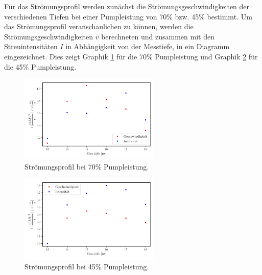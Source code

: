 Für das Strömungsprofil werden zunächst die Strömungsgeschwindigkeiten der verschiedenen Tiefen bei einer Pumpleistung von 
70\% bzw. 45\% bestimmt. 
Um das Strömungsprofil veranschaulichen zu können, werden die Strömungsgeschwindigkeiten $v$ berechneten und zusammen mit den Streuintensitäten $I$
in Abhängigkeit von der Messtiefe, in ein Diagramm eingezeichnet. Dies zeigt Graphik \ref{fig:70P} für die 70\% Pumpleistung und Graphik \ref{fig:45P} 
für die 45\% Pumpleistung.

\begin{figure}
    \centering
    \includegraphics[width = 0.60\textwidth]{plot2.pdf}
    \caption{Strömungsprofil bei 70\% Pumpleistung.}
    \label{fig:70P}
\end{figure}

\begin{figure}
    \centering
    \includegraphics[width = 0.60\textwidth]{plot3.pdf}
    \caption{Strömungsprofil bei 45\% Pumpleistung.}
    \label{fig:45P}
\end{figure}
